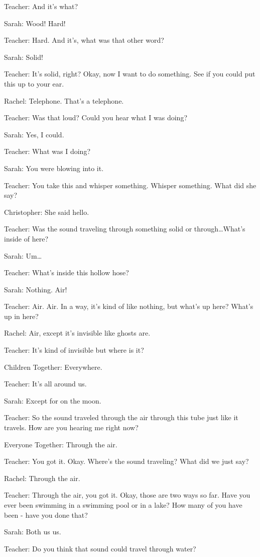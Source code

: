 Teacher: And it's what?

Sarah: Wood! Hard!

Teacher: Hard. And it's, what was that other word?

Sarah: Solid!

Teacher: It's solid, right? Okay, now I want to do something. See if you could put this up to your ear.

Rachel: Telephone. That's a telephone.

Teacher: Was that loud? Could you hear what I was doing?

Sarah: Yes, I could.

Teacher: What was I doing?

Sarah: You were blowing into it.

Teacher: You take this and whisper something. Whisper something. What did she say?

Christopher: She said hello.

Teacher: Was the sound traveling through something solid or through\dots What's inside of here?

Sarah: Um\dots

Teacher: What's inside this hollow hose?

Sarah: Nothing. Air!

Teacher: Air. Air. In a way, it's kind of like nothing, but what's up here? What's up in here?

Rachel: Air, except it's invisible like ghosts are.

Teacher: It's kind of invisible but where is it?

Children Together: Everywhere.

Teacher: It's all around us.

Sarah: Except for on the moon.

Teacher: So the sound traveled through the air through this tube just like it travels. How are you hearing me right now?

Everyone Together: Through the air.

Teacher: You got it. Okay. Where's the sound traveling? What did we just say?

Rachel: Through the air.

Teacher: Through the air, you got it. Okay, those are two ways so far. Have you ever been swimming in a swimming pool or in a lake? How many of you have been - have you done that?

Sarah: Both us us.

Teacher: Do you think that sound could travel through water?

